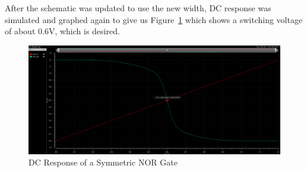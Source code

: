 \documentclass[12pt]{article}
\begin{document}
After the schematic was updated to use the new width, DC response was simulated and graphed again to give us Figure~\ref{fig:nor_dc_symm} which shows a switching voltage
of about 0.6V, which is desired.
\begin{figure}[!htb]
  \centering
  \includegraphics[width=5in]{figures/nor/nor_dc_symm.png}
  \caption{DC Response of a Symmetric NOR Gate}\label{fig:nor_dc_symm}
\end{figure}
\end{document}
